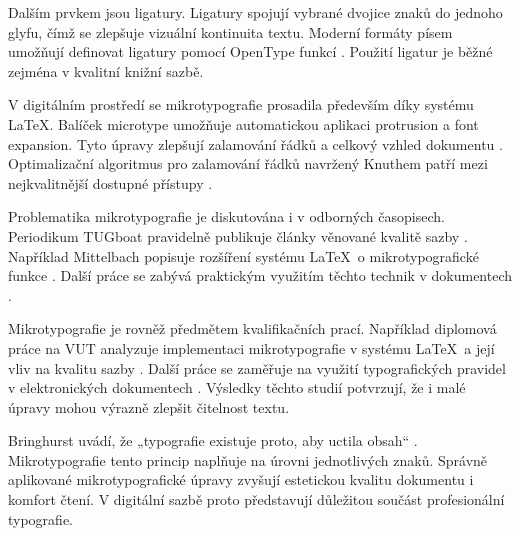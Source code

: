\documentclass[a4paper,11pt]{article}
\begin{document}
Dalším prvkem jsou ligatury. 
Ligatury spojují vybrané dvojice znaků do jednoho glyfu, čímž se zlepšuje vizuální kontinuita textu. 
Moderní formáty písem umožňují definovat ligatury pomocí OpenType funkcí \cite{opentype}. 
Použití ligatur je běžné zejména v kvalitní knižní sazbě. 

V digitálním prostředí se mikrotypografie prosadila především díky systému \LaTeX. 
Balíček microtype umožňuje automatickou aplikaci protrusion a font expansion. 
Tyto úpravy zlepšují zalamování řádků a celkový vzhled dokumentu \cite{latexmicro}. 
Optimalizační algoritmus pro zalamování řádků navržený Knuthem patří mezi nejkvalitnější dostupné přístupy \cite{knuth}. 

Problematika mikrotypografie je diskutována i v odborných časopisech. 
Periodikum TUGboat pravidelně publikuje články věnované kvalitě sazby \cite{tugboat}. 
Například Mittelbach popisuje rozšíření systému \LaTeX\ o mikrotypografické funkce \cite{mittelbach}. 
Další práce se zabývá praktickým využitím těchto technik v dokumentech \cite{hoenig}. 

Mikrotypografie je rovněž předmětem kvalifikačních prací. 
Například diplomová práce na VUT analyzuje implementaci mikrotypografie v systému \LaTeX\ a její vliv na kvalitu sazby \cite{vutthesis}. 
Další práce se zaměřuje na využití typografických pravidel v elektronických dokumentech \cite{cvutthesis}. 
Výsledky těchto studií potvrzují, že i malé úpravy mohou výrazně zlepšit čitelnost textu. 

Bringhurst uvádí, že „typografie existuje proto, aby uctila obsah“ \cite{bringhurst}. 
Mikrotypografie tento princip naplňuje na úrovni jednotlivých znaků. 
Správně aplikované mikrotypografické úpravy zvyšují estetickou kvalitu dokumentu i komfort čtení. 
V digitální sazbě proto představují důležitou součást profesionální typografie. 

\clearpage


\end{document}
